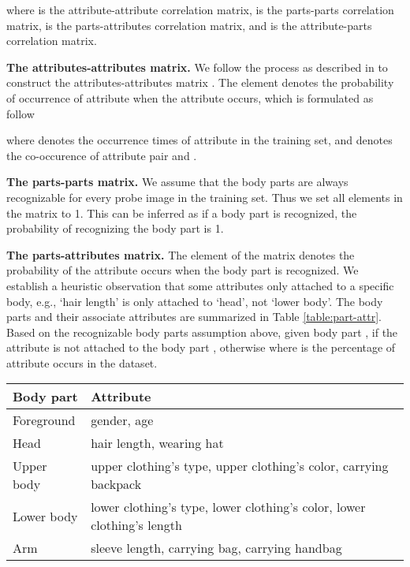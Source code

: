 \documentclass[final]{cvpr}
\begin{document}
where  is the attribute-attribute correlation matrix,  is the parts-parts correlation matrix,  is the parts-attributes correlation matrix, and  is the attribute-parts correlation matrix.

\textbf{The attributes-attributes matrix.} We follow the process as described in \cite{chen2019} to construct the attributes-attributes matrix . The element  denotes the probability of occurrence of attribute  when the attribute  occurs, which is formulated as follow

where  denotes the occurrence times of attribute  in the training set, and  denotes the co-occurence of attribute pair  and .

\textbf{The parts-parts matrix.} We assume that the body parts are always recognizable for every probe image in the training set. Thus we set all elements in the  matrix to 1. This can be inferred as if a body part  is recognized, the probability of recognizing the body part  is 1.

\textbf{The parts-attributes matrix.} The element of the matrix  denotes the probability of the attribute  occurs when the body part  is recognized. We establish a heuristic observation that some attributes only attached to a specific body, e.g., `hair length' is only attached to `head', not `lower body'. The body parts and their associate attributes are summarized in Table \ref{table:part-attr}. Based on the recognizable body parts assumption above, given body part ,  if the attribute  is not attached to the body part , otherwise  where  is the percentage of attribute  occurs in the dataset.
\begin{table*}[!t]
\caption{Body parts and their associated attributes.}
\label{table:part-attr}
\centering
\begin{tabular}{l|l} 
\hline
\textbf{Body part} & \textbf{Attribute}                                                      \\ 
\hline
Foreground         & gender, age                                                             \\ 
\hline
Head               & hair length, wearing hat~                                               \\ 
\hline
Upper body         & upper clothing's type, upper clothing's color, carrying backpack~~      \\ 
\hline
Lower body         & lower clothing's type, lower clothing's color, lower clothing's length  \\ 
\hline
Arm                & sleeve length, carrying bag, carrying handbag~                          \\
\hline
\end{tabular}
\end{table*}
\end{document}
